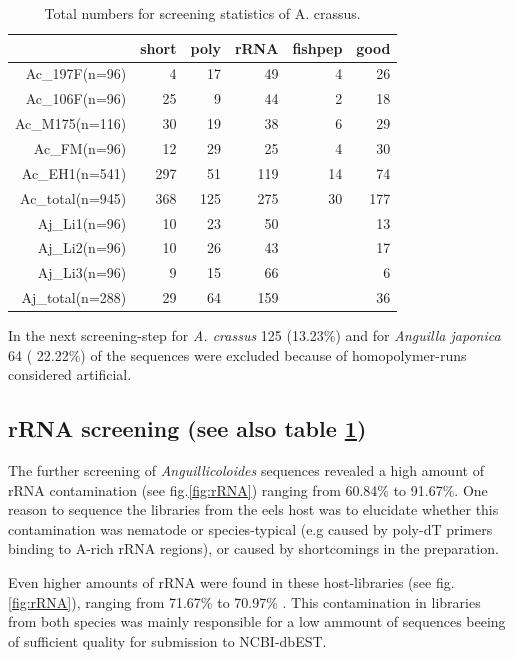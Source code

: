 \documentclass[12pt,a4paper]{article}
\begin{document}
\begin{table}[ht]
\begin{center}
\begin{tabular}{rrrrrr}
  \hline
 & short & poly & rRNA & fishpep & good \\ 
  \hline
Ac\_197F(n=96) &   4 &  17 &  49 &   4 &  26 \\ 
  Ac\_106F(n=96) &  25 &   9 &  44 &   2 &  18 \\ 
  Ac\_M175(n=116) &  30 &  19 &  38 &   6 &  29 \\ 
  Ac\_FM(n=96) &  12 &  29 &  25 &   4 &  30 \\ 
  Ac\_EH1(n=541) & 297 &  51 & 119 &  14 &  74 \\ 
  Ac\_total(n=945) & 368 & 125 & 275 &  30 & 177 \\ 
  Aj\_Li1(n=96) &  10 &  23 &  50 &  &  13 \\ 
  Aj\_Li2(n=96) &  10 &  26 &  43 &  &  17 \\ 
  Aj\_Li3(n=96) &   9 &  15 &  66 &  &   6 \\ 
  Aj\_total(n=288) &  29 &  64 & 159 &  &  36 \\ 
   \hline
\end{tabular}
\caption{Total numbers for screening statistics of A. crassus.}
\label{tab:num}
\end{center}
\end{table}
In the next screening-step for \textit{A. crassus}
125
(13.23\%) and for
\textit{Anguilla japonica}  64 (
22.22\%) of the sequences were
excluded because of homopolymer-runs considered artificial.

\subsection*{rRNA screening (see also table \ref{tab:num})}

The further screening of \textit{Anguillicoloides} sequences revealed
a high amount of rRNA contamination (see fig.\ref{fig:rRNA}) ranging
from 60.84\% to
91.67\%. One reason to sequence
the libraries from the eels host was to elucidate whether this
contamination was nematode or species-typical (e.g caused by poly-dT
primers binding to A-rich rRNA regions), or caused by shortcomings in
the preparation.

Even higher amounts of rRNA were found in these host-libraries (see
fig. \ref{fig:rRNA}), ranging from
71.67\% to
70.97\% . This contamination in
libraries from both species was mainly responsible for a low ammount
of sequences beeing of sufficient quality for submission to
NCBI-dbEST.
\end{document}
